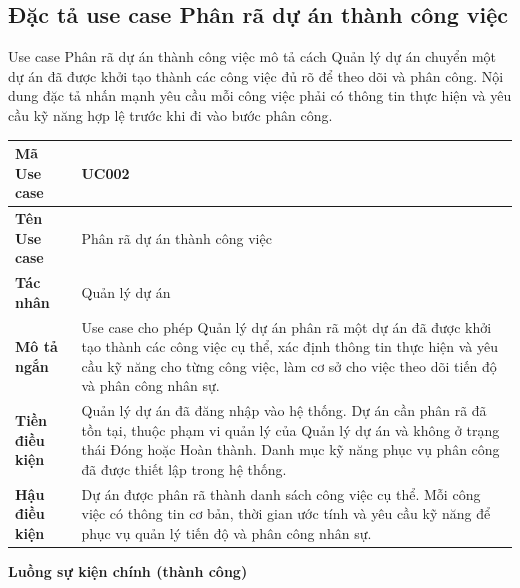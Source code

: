 \documentclass[../DoAn.tex]{subfiles}
\begin{document}
\subsection{Đặc tả use case Phân rã dự án thành công việc}
\label{subsection:2.3.2}
Use case Phân rã dự án thành công việc mô tả cách Quản lý dự án chuyển một dự án đã được khởi tạo thành các công việc đủ rõ để theo dõi và phân công. Nội dung đặc tả nhấn mạnh yêu cầu mỗi công việc phải có thông tin thực hiện và yêu cầu kỹ năng hợp lệ trước khi đi vào bước phân công.

{\ucTableText
\begin{longtable}{|>{\columncolor{ucLabelBg}\bfseries}p{}|p{}|}
\hline
Mã Use case & UC002 \\ \hline
Tên Use case & Phân rã dự án thành công việc \\ \hline
Tác nhân & Quản lý dự án \\ \hline
Mô tả ngắn & Use case cho phép Quản lý dự án phân rã một dự án đã được khởi tạo thành các công việc cụ thể, xác định thông tin thực hiện và yêu cầu kỹ năng cho từng công việc, làm cơ sở cho việc theo dõi tiến độ và phân công nhân sự. \\ \hline
Tiền điều kiện & Quản lý dự án đã đăng nhập vào hệ thống. Dự án cần phân rã đã tồn tại, thuộc phạm vi quản lý của Quản lý dự án và không ở trạng thái Đóng hoặc Hoàn thành. Danh mục kỹ năng phục vụ phân công đã được thiết lập trong hệ thống. \\ \hline
Hậu điều kiện & Dự án được phân rã thành danh sách công việc cụ thể. Mỗi công việc có thông tin cơ bản, thời gian ước tính và yêu cầu kỹ năng để phục vụ quản lý tiến độ và phân công nhân sự. \\ \hline
\end{longtable}
}

\textbf{Luồng sự kiện chính (thành công)}
\end{document}

